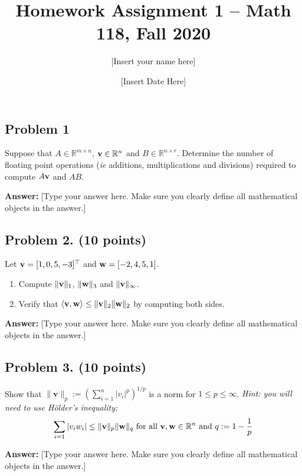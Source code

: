 \documentclass[12pt]{article}
\newcommand{\bfv}{{\bf v}}
\newcommand{\bfw}{{\bf w}}
\begin{document}
\title{Homework Assignment 1 -- Math 118, Fall 2020}
\date{[Insert Date Here]}
\author{[Insert your name here]}
\maketitle


\newpage
\subsection*{Problem 1} Suppose that $A\in\mathbb{R}^{m\times n}$, $\bfv\in\mathbb{R}^{n}$ and $B\in\mathbb{R}^{n\times r}$. Determine the number of floating point operations ({\em ie} additions,  multiplications and divisions) required to compute $A\bfv$ and $AB$.

\medskip
\noindent\textbf{Answer:} [Type your answer here. Make sure you clearly define all mathematical objects in the answer.]

\newpage
\subsection*{Problem 2. (10 points)} Let $\bfv = [1,0,5,-3]^{\top}$ and $\bfw = [-2,4,5,1]$.
\begin{enumerate}
	\item Compute $\|\bfv\|_1$, $\|\bfw\|_{3}$ and $\|\bfv\|_{\infty}$. \\
	\item Verify that $\langle\bfv,\bfw\rangle \leq \|\bfv\|_2\|\bfw\|_2$ by computing both sides. \\
\end{enumerate}

\medskip
\noindent\textbf{Answer:} [Type your answer here. Make sure you clearly define all mathematical objects in the answer.]

\newpage
\subsection*{Problem 3. (10 points)} Show that $\displaystyle \|\mathbf{v}\|_{p} := \left(\sum_{i=1}^{n} |v_i|^{p}\right)^{1/p}$ is a norm for $1\leq p \leq \infty$. {\em Hint: you will need to use H\"{o}lder's inequality:
$$
\sum_{i=1}|v_iw_i| \leq \|\bfv\|_{p}\|\bfw\|_{q} \text{ for all } \bfv, \bfw\in\mathbb{R}^{n} \text{ and } q:= 1-\frac{1}{p}
$$
}

\medskip
\noindent\textbf{Answer:} [Type your answer here. Make sure you clearly define all mathematical objects in the answer.]
\end{document}
